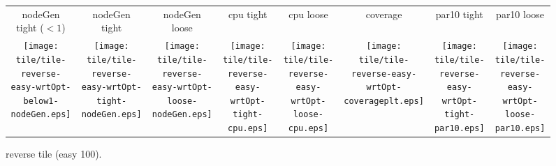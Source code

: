\documentclass[a4paper,landscape]{article}
\begin{document}
\begin{figure}[t]
	\centering
    \begin{tabular}{c c c c c c c c}
        nodeGen tight ($<1$) & nodeGen tight & nodeGen loose & cpu
        tight & cpu loose & coverage & par10 tight & par10 loose\\
	   \begin{minipage}{\cpufigureplotwidth}
      \texttt{[image: tile/tile-reverse-easy-wrtOpt-below1-nodeGen.eps]}
        \end{minipage}&
        \begin{minipage}{\cpufigureplotwidth}
        \texttt{[image: tile/tile-reverse-easy-wrtOpt-tight-nodeGen.eps]}
        \end{minipage}&
        \begin{minipage}{\cpufigureplotwidth}
      \texttt{[image: tile/tile-reverse-easy-wrtOpt-loose-nodeGen.eps]}
      \end{minipage}&
        \begin{minipage}{\cpufigureplotwidth}
        \texttt{[image: tile/tile-reverse-easy-wrtOpt-tight-cpu.eps]}
        \end{minipage}&
        \begin{minipage}{\cpufigureplotwidth}
        \texttt{[image: tile/tile-reverse-easy-wrtOpt-loose-cpu.eps]}
        \end{minipage}&
        \begin{minipage}{\cpufigureplotwidth}
        \texttt{[image: tile/tile-reverse-easy-wrtOpt-coverageplt.eps]}
        \end{minipage}&
        \begin{minipage}{\cpufigureplotwidth}
        \texttt{[image: tile/tile-reverse-easy-wrtOpt-tight-par10.eps]}
        \end{minipage}&
        \begin{minipage}{\cpufigureplotwidth}
        \texttt{[image: tile/tile-reverse-easy-wrtOpt-loose-par10.eps]}
        \end{minipage}
	\end{tabular}
\caption{reverse tile (easy 100).}
\label{fig:tile-reverse-easy}
\end{figure}
\end{document}
